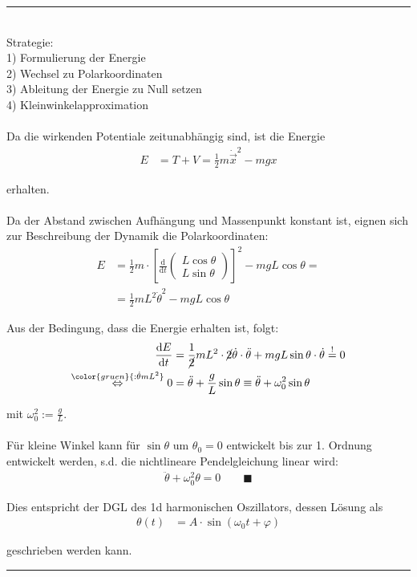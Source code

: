 \documentclass{article}
\newcommand{\diff}{\mathrm{d}}
\newcommand{\lreck}[1]{\left[#1\right]}
\newcommand{\comment}[1]{{\color{gruen} {#1}}}
\begin{document}
{\color{violet}
\hrule
	\\
	Strategie:\\
	1) Formulierung der Energie\\
	2) Wechsel zu Polarkoordinaten\\
	3) Ableitung der Energie zu Null setzen\\
	4) Kleinwinkelapproximation\\
	\\
	Da die wirkenden Potentiale zeitunabhängig sind, ist die Energie
		\begin{align*}
			E &= T + V = \frac{1}{2} m \dot{\vec{x}}^2 - mgx
		\end{align*}
	
	erhalten.\\
	\\
	Da der Abstand zwischen Aufhängung und Massenpunkt konstant ist, eignen sich zur Beschreibung der Dynamik die Polarkoordinaten:
		\begin{align*}
			E &= \frac{1}{2}m
			\cdot
			\lreck{
			\frac{\diff}{\diff t}
			\begin{pmatrix}
				L \cos\theta \\
				L \sin\theta
			\end{pmatrix}
			}^2
			-
			mgL\cos\theta = \\
			&= \frac{1}{2}mL^2\dot{\theta}^2 - mgL\cos\theta
		\end{align*}
	
	Aus der Bedingung, dass die Energie erhalten ist, folgt:
		\begin{align*}
			\frac{\diff E}{\diff t} &= \frac{1}{\cancel{2}}mL^2 \cdot \cancel{2} \dot{\theta} \cdot \ddot{\theta} + mgL\sin\theta \cdot \dot{\theta} \stackrel{!}{=} 0 \\
			\stackrel{\comment{:\dot{\theta}mL^2}}{\Leftrightarrow} 0 &= \ddot{\theta} + \frac{g}{L}\sin\theta \equiv \ddot{\theta} + \omega_0^2 \sin\theta
		\end{align*}
	
	mit $\omega_0^2 := \frac{g}{L}$.\\
	\\
	Für kleine Winkel kann für $\sin\theta$ um $\theta_0=0$ entwickelt bis zur 1. Ordnung entwickelt werden, s.d. die nichtlineare Pendelgleichung linear wird:
		\begin{align*}
			\ddot{\theta} + \omega_0^2 \theta = 0 \qquad \blacksquare
		\end{align*}
	
	Dies entspricht der DGL des 1d harmonischen Oszillators, dessen Lösung als
		\begin{align*}
			\theta(t) &= A \cdot \sin(\omega_0 t + \varphi)
		\end{align*}
	
	geschrieben werden kann.


\hrule
}
\end{document}

